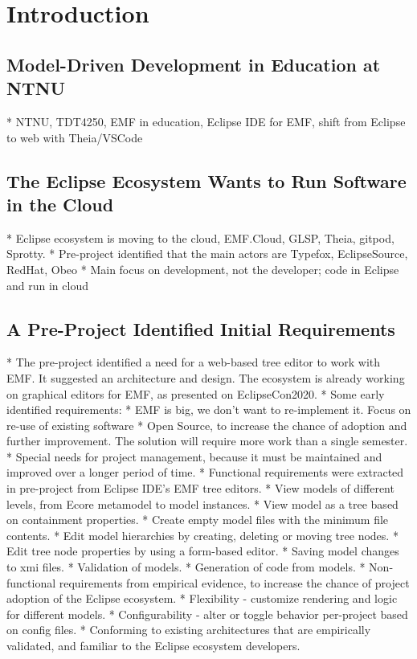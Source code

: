 \chapter{Introduction}\label{chap:introduction}

\section{Model-Driven Development in Education at NTNU}

* NTNU, TDT4250, EMF in education, Eclipse IDE for EMF, shift from Eclipse to web with Theia/VSCode

\section{The Eclipse Ecosystem Wants to Run Software in the Cloud}

* Eclipse ecosystem is moving to the cloud, EMF.Cloud, GLSP, Theia, gitpod, Sprotty.
  * Pre-project identified that the main actors are Typefox, EclipseSource, RedHat, Obeo
  * Main focus on development, not the developer; code in Eclipse and run in cloud

\section{A Pre-Project Identified Initial Requirements}

* The pre-project identified a need for a web-based tree editor to work with EMF. It suggested an architecture and design. The ecosystem is already working on graphical editors for EMF, as presented on EclipseCon2020.
  * Some early identified requirements:
    * EMF is big, we don't want to re-implement it. Focus on re-use of existing software
    * Open Source, to increase the chance of adoption and further improvement. The solution will require more work than a single semester.
    * Special needs for project management, because it must be maintained and improved over a longer period of time.
  * Functional requirements were extracted in pre-project from Eclipse IDE's EMF tree editors.
    * View models of different levels, from Ecore metamodel to model instances.
    * View model as a tree based on containment properties.
    * Create empty model files with the minimum file contents.
    * Edit model hierarchies by creating, deleting or moving tree nodes.
    * Edit tree node properties by using a form-based editor.
    * Saving model changes to xmi files.
    * Validation of models.
    * Generation of code from models.
  * Non-functional requirements from empirical evidence, to increase the chance of project adoption of the Eclipse ecosystem.
    * Flexibility - customize rendering and logic for different models.
    * Configurability - alter or toggle behavior per-project based on config files.
    * Conforming to existing architectures that are empirically validated, and familiar to the Eclipse ecosystem developers.